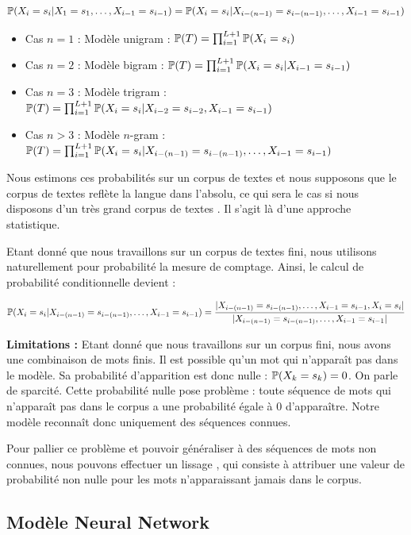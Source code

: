 \[ \P(X_i=s_i \vert X_1=s_1,\ldots, X_{i-1}=s_{i-1}) = \P(X_i=s_i \vert X_{i-(n-1)}=s_{i-(n-1)},\ldots, X_{i-1}=s_{i-1}) \]

\vspace{0.4cm}

\begin{itemize}
  \item Cas $n=1$ : Modèle unigram : $\P(T) = \prod_{i=1}^{L+1} \P(X_i = s_i)$
  \item Cas $n=2$ : Modèle bigram : $\P(T) = \prod_{i=1}^{L+1} \P(X_i = s_i\vert X_{i-1} = s_{i-1})$
  \item Cas $n=3$ : Modèle trigram : $\P(T) = \prod_{i=1}^{L+1} \P(X_i = s_i\vert X_{i-2} = s_{i-2}, X_{i-1} = s_{i-1})$
  \item Cas $n > 3$ : Modèle $n$-gram : $\P(T) = \prod_{i=1}^{L+1} \P(X_i = s_i\vert X_{i-(n-1)} = s_{i-(n-1)}, \ldots, X_{i-1} = s_{i-1})$
\end{itemize}

Nous estimons ces probabilités sur un corpus de textes et nous supposons que le corpus de textes reflète la langue dans l'absolu,
ce qui sera le cas si nous disposons d'un très grand corpus de textes . Il s'agit là d'une approche statistique.

Etant donné que nous travaillons sur un corpus de textes fini, nous utilisons naturellement pour probabilité la mesure de comptage. Ainsi, le calcul de probabilité conditionnelle devient :

\[ \P(X_i = s_i\vert X_{i-(n-1)} = s_{i-(n-1)}, \ldots, X_{i-1} = s_{i-1}) = \frac{\vert X_{i-(n-1)} = s_{i-(n-1)}, \ldots, X_{i-1} = s_{i-1}, X_i = s_i\vert}{\vert X_{i-(n-1)} = s_{i-(n-1)},\ldots, X_{i-1} = s_{i-1}\vert} \]

\textbf{Limitations :} Etant donné que nous travaillons sur un corpus fini, nous avons une combinaison de mots finis. Il est possible qu'un mot qui n'apparaît pas dans le modèle. Sa probabilité d'apparition est donc nulle : $\P(X_k = s_k) = 0$. On parle de sparcité. Cette probabilité nulle pose problème : toute séquence de mots qui n'apparaît pas dans le corpus a une probabilité égale à 0 d'apparaître.
Notre modèle reconnaît donc uniquement des séquences connues.

Pour pallier ce problème et pouvoir généraliser à des séquences de mots non connues, nous pouvons effectuer un \og lissage \fg{}, qui consiste à attribuer une valeur de probabilité non nulle pour les mots n'apparaissant jamais dans le corpus.

\subsection{Modèle Neural Network}

